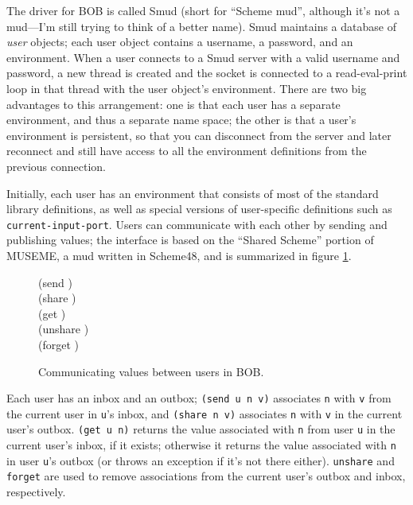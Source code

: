 \documentclass{article}
\begin{document}
The driver for BOB is called Smud (short for ``Scheme mud'', although
it's not a mud---I'm still trying to think of a better name).  Smud
maintains a database of \emph{user} objects; each user object contains
a username, a password, and an environment.  When a user connects to a
Smud server with a valid username and password, a new thread is
created and the socket is connected to a read-eval-print loop in that
thread with the user object's environment.  There are two big
advantages to this arrangement: one is that each user has a separate
environment, and thus a separate name space; the other is that a
user's environment is persistent, so that you can disconnect from the
server and later reconnect and still have access to all the
environment definitions from the previous connection.

Initially, each user has an environment that consists of most of the
standard library definitions, as well as special versions of
user-specific definitions such as \texttt{current-input-port}.  Users
can communicate with each other by sending and publishing values; the
interface is based on the ``Shared Scheme'' portion of MUSEME, a
mud written in Scheme48\cite{MUSEME}, and is summarized in figure
\ref{shared-scheme}.

\begin{figure}
\begin{center}
\begin{grammar}
(send   ) \\
(share  ) \\
(get  ) \\
(unshare ) \\
(forget  )
\end{grammar}
\end{center}
\caption{Communicating values between users in BOB.}\label{shared-scheme}
\end{figure}

Each user has an inbox and an outbox; \texttt{(send u n v)} associates 
\texttt{n} with \texttt{v} from the current user in \texttt{u}'s
inbox, and \texttt{(share n v)} associates \texttt{n} with \texttt{v}
in the current user's outbox.  \texttt{(get u n)} returns the value
associated with \texttt{n} from user \texttt{u} in the current user's
inbox, if it exists; otherwise it returns the value associated with
\texttt{n} in user \texttt{u}'s outbox (or throws an exception if it's 
not there either).  \texttt{unshare} and \texttt{forget} are used to
remove associations from the current user's outbox and inbox,
respectively.
\end{document}

